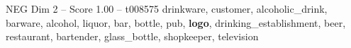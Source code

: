 \begin{textsample}{NEG Dim 2 – Score 1.00 – t008575}  \label{ex:f2_neg_018}
drinkware, customer, alcoholic\_drink, barware, alcohol, liquor, bar, bottle, pub, \textbf{logo}, drinking\_establishment, beer, restaurant, bartender, glass\_bottle, shopkeeper, television

\end{textsample}
